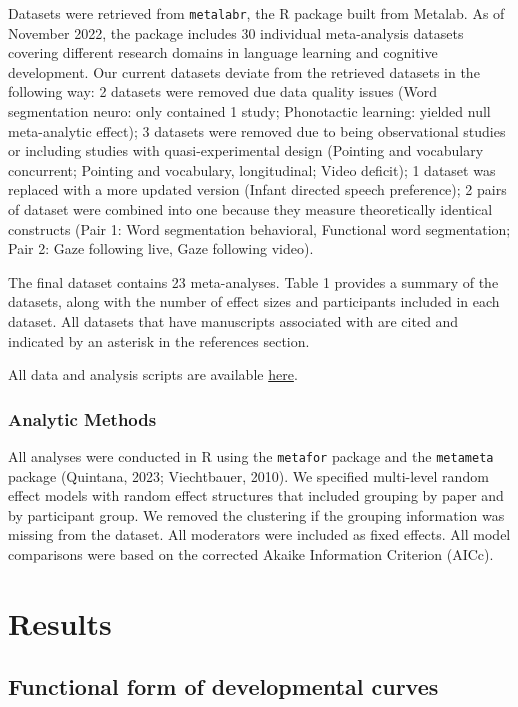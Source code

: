 \documentclass[10pt, letterpaper]{article}
\begin{document}
Datasets were retrieved from \texttt{metalabr}, the R package built from
Metalab. As of November 2022, the package includes 30 individual
meta-analysis datasets covering different research domains in language
learning and cognitive development. Our current datasets deviate from
the retrieved datasets in the following way: 2 datasets were removed due
data quality issues (Word segmentation neuro: only contained 1 study;
Phonotactic learning: yielded null meta-analytic effect); 3 datasets
were removed due to being observational studies or including studies
with quasi-experimental design (Pointing and vocabulary concurrent;
Pointing and vocabulary, longitudinal; Video deficit); 1 dataset was
replaced with a more updated version (Infant directed speech
preference); 2 pairs of dataset were combined into one because they
measure theoretically identical constructs (Pair 1: Word segmentation
behavioral, Functional word segmentation; Pair 2: Gaze following live,
Gaze following video).

The final dataset contains 23 meta-analyses. Table 1 provides a summary
of the datasets, along with the number of effect sizes and participants
included in each dataset. All datasets that have manuscripts associated
with are cited and indicated by an asterisk in the references section.

All data and analysis scripts are available
\href{https://github.com/anjiecao/metalab_CogSci2023}{here}.

\hypertarget{analytic-methods}{%
\subsubsection{Analytic Methods}\label{analytic-methods}}

All analyses were conducted in R using the \texttt{metafor} package and
the \texttt{metameta} package (Quintana, 2023; Viechtbauer, 2010). We
specified multi-level random effect models with random effect structures
that included grouping by paper and by participant group. We removed the
clustering if the grouping information was missing from the dataset. All
moderators were included as fixed effects. All model comparisons were
based on the corrected Akaike Information Criterion (AICc).

\hypertarget{results}{%
\section{Results}\label{results}}

\hypertarget{functional-form-of-developmental-curves}{%
\subsection{Functional form of developmental
curves}\label{functional-form-of-developmental-curves}}
\end{document}
